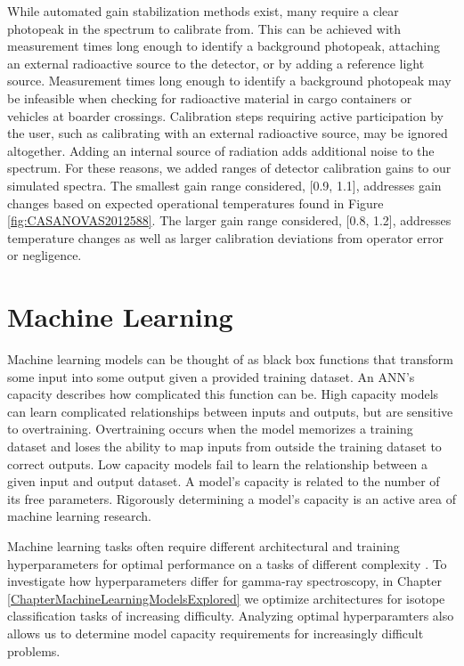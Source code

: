 While automated gain stabilization methods exist, many require a clear photopeak in the spectrum to calibrate from. This can be achieved with measurement times long enough to identify a background photopeak, attaching an external radioactive source to the detector, or by adding a reference light source. Measurement times long enough to identify a background photopeak may be infeasible when checking for radioactive material in cargo containers or vehicles at boarder crossings. Calibration steps requiring active participation by the user, such as calibrating with an external radioactive source, may be ignored altogether. Adding an internal source of radiation adds additional noise to the spectrum. For these reasons, we added ranges of detector calibration gains to our simulated spectra. The smallest gain range considered, [0.9, 1.1], addresses gain changes based on expected operational temperatures found in Figure \ref{fig:CASANOVAS2012588}. The larger gain range considered, [0.8, 1.2], addresses temperature changes as well as larger calibration deviations from operator error or negligence.


\section{Machine Learning}

Machine learning models can be thought of as black box functions that transform some input into some output given a provided training dataset. An ANN's capacity describes how complicated this function can be. High capacity models can learn complicated relationships between inputs and outputs, but are sensitive to overtraining. Overtraining occurs when the model memorizes a training dataset and loses the ability to map inputs from outside the training dataset to correct outputs. Low capacity models fail to learn the relationship between a given input and output dataset. A model's capacity is related to the number of its free parameters. Rigorously determining a model's capacity is an active area of machine learning research. 

Machine learning tasks often require different architectural and training hyperparameters for optimal performance on a tasks of different complexity \cite{Bergstra2012}. To investigate how hyperparameters differ for gamma-ray spectroscopy, in Chapter \ref{ChapterMachineLearningModelsExplored} we optimize architectures for isotope classification tasks of increasing difficulty. Analyzing optimal hyperparamters also allows us to determine model capacity requirements for increasingly difficult problems.

